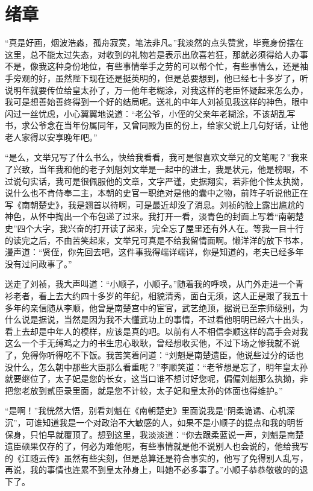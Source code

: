 \part{绪章}

“真是好画，烟波浩淼，孤舟寂寞，笔法非凡。”我淡然的点头赞赏，毕竟身份摆在这里，总不能太过失态，对收到的礼物若是表示出欣喜若狂，那就必须得给人办事不是，像我这种身份地位，有些事情举手之劳的可以帮个忙，有些事情么，还是袖手旁观的好，虽然陛下现在还是挺英明的，但是总要想到，他已经七十多岁了，听说明年就要传位给皇太孙了，万一他年老糊涂，对我这样的老臣怀疑起来怎么办，我可是想善始善终得到一个好的结局呢。送礼的中年人刘祯见我这样的神色，眼中闪过一丝忧虑，小心翼翼地说道：“老公爷，小侄的父亲年老糊涂，不该胡乱写书，求公爷念在当年份属同年，又曾同殿为臣的份上，给家父说上几句好话，让他老人家得以安享晚年吧。”

“是么，文举兄写了什么书么，快给我看看，我可是很喜欢文举兄的文笔呢？”我来了兴致，当年我和他的老子刘魁刘文举是一起中的进士，我是状元，他是榜眼，不过说句实话，我可是很佩服他的文章，文字严谨，史据翔实，若非他个性太执拗，说什么也不肯侍奉二主，本朝的史官一职绝对是他的囊中之物，前阵子听说他正在写《南朝楚史》，我是翘首以待啊，可是最近却没了消息。刘祯的脸上露出尴尬的神色，从怀中掏出一个布包递了过来。我打开一看，淡青色的封面上写着“南朝楚史”四个大字，我兴奋的打开读了起来，完全忘了屋里还有外人在。等我一目十行的读完之后，不由苦笑起来，文举兄可真是不给我留情面啊。懒洋洋的放下书本，漫声道：“贤侄，你先回去吧，这件事我得端详端详，你是知道的，老夫已经多年没有过问政事了。”

送走了刘祯，我大声叫道：“小顺子，小顺子。”随着我的呼唤，从门外走进一个青衫老者，看上去大约四十多岁的年纪，相貌清秀，面白无须，这人正是跟了我五十多年的亲信随从李顺，他曾是南楚宫中的宦官，武艺绝顶，据说已至宗师级别，为什么说是据说，当然是因为我不大懂武功上的事情，不过看他明明已经六十出头，看上去却是中年人的模样，应该是真的吧。以前有人不相信李顺这样的高手会对我这么一个手无缚鸡之力的书生忠心耿耿，曾经想收买他，不过下场之惨我就不说了，免得你听得吃不下饭。我苦笑着问道：“刘魁是南楚遗臣，他说些过分的话也没什么，怎么朝中那些大臣那么看重呢？”李顺笑道：“老爷想是忘了，明年皇太孙就要继位了，太子妃是您的长女，这当口谁不想讨好您呢，偏偏刘魁那么执拗，非把您老放到贰臣录里面，就是您不计较，太子妃和皇太孙的体面也得维护。”

“是啊！”我恍然大悟，别看刘魁在《南朝楚史》里面说我是“阴柔诡谲、心机深沉”，可谁知道我是一个对政治不大敏感的人，如果不是小顺子的提点和我的明哲保身，只怕早就覆顶了。想到这里，我淡淡道：“你去跟柔蓝说一声，刘魁是南楚遗臣硕果仅存的了，何必为难他呢，有些事情就是他不说别人也会说的，他给我写的《江随云传》虽然有些尖刻，但是总算还是符合事实的，他写了免得别人乱写，再说，我的事情也连累不到皇太孙身上，叫她不必多事了。”小顺子恭恭敬敬的的退下了。

